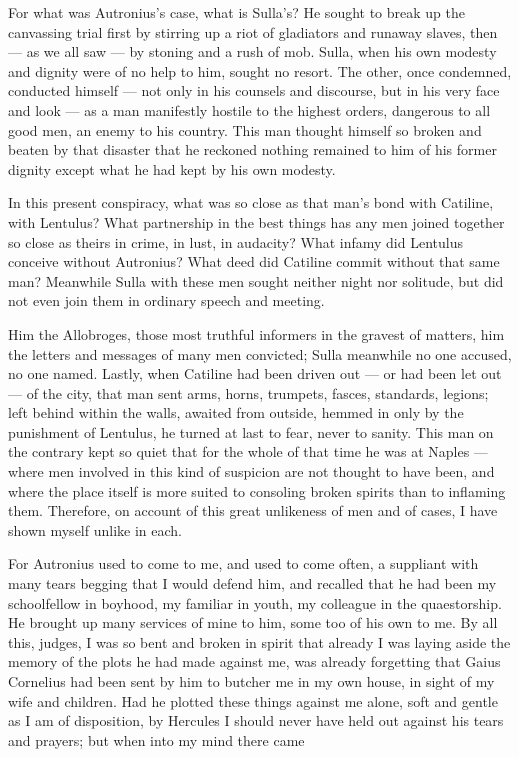  For what was Autronius's case, what is Sulla's? He sought to break up the canvassing trial first by stirring up a riot of gladiators and runaway slaves, then --- as we all saw --- by stoning and a rush of mob. Sulla, when his own modesty and dignity were of no help to him, sought no resort. The other, once condemned, conducted himself --- not only in his counsels and discourse, but in his very face and look --- as a man manifestly hostile to the highest orders, dangerous to all good men, an enemy to his country. This man thought himself so broken and beaten by that disaster that he reckoned nothing remained to him of his former dignity except what he had kept by his own modesty.

 In this present conspiracy, what was so close as that man's bond with Catiline, with Lentulus? What partnership in the best things has any men joined together so close as theirs in crime, in lust, in audacity? What infamy did Lentulus conceive without Autronius? What deed did Catiline commit without that same man? Meanwhile Sulla with these men sought neither night nor solitude, but did not even join them in ordinary speech and meeting.

 Him the Allobroges, those most truthful informers in the gravest of matters, him the letters and messages of many men convicted; Sulla meanwhile no one accused, no one named. Lastly, when Catiline had been driven out --- or had been let out --- of the city, that man sent arms, horns, trumpets, fasces, standards, legions; left behind within the walls, awaited from outside, hemmed in only by the punishment of Lentulus, he turned at last to fear, never to sanity. This man on the contrary kept so quiet that for the whole of that time he was at Naples --- where men involved in this kind of suspicion are not thought to have been, and where the place itself is more suited to consoling broken spirits than to inflaming them. Therefore, on account of this great unlikeness of men and of cases, I have shown myself unlike in each.

 For Autronius used to come to me, and used to come often, a suppliant with many tears begging that I would defend him, and recalled that he had been my schoolfellow in boyhood, my familiar in youth, my colleague in the quaestorship. He brought up many services of mine to him, some too of his own to me. By all this, judges, I was so bent and broken in spirit that already I was laying aside the memory of the plots he had made against me, was already forgetting that Gaius Cornelius had been sent by him to butcher me in my own house, in sight of my wife and children. Had he plotted these things against me alone, soft and gentle as I am of disposition, by Hercules I should never have held out against his tears and prayers; but when into my mind there came

